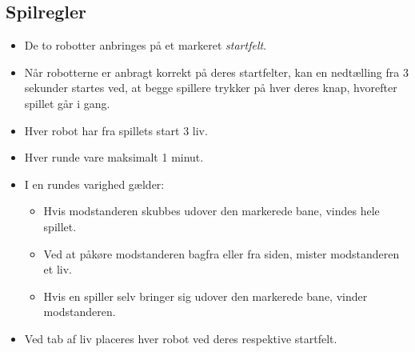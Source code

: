 \subsection{Spilregler} \label{Spilregler}
\begin{itemize}
    \item De to robotter anbringes på et markeret \textit{startfelt}.
    \item Når robotterne er anbragt korrekt på deres startfelter, kan en nedtælling fra 3 sekunder startes ved, at begge spillere trykker på hver deres knap, hvorefter spillet går i gang.
    \item Hver robot har fra spillets start 3 liv.
    \item Hver runde vare maksimalt 1 minut.
    \item I en rundes varighed gælder:
    \begin{itemize}
        \item Hvis modstanderen skubbes udover den markerede bane, vindes hele spillet.
        \item Ved at påkøre modstanderen bagfra eller fra siden, mister modstanderen et liv.
        \item Hvis en spiller selv bringer sig udover den markerede bane, vinder modstanderen.
    \end{itemize}
    \item Ved tab af liv placeres hver robot ved deres respektive startfelt.
\end{itemize}